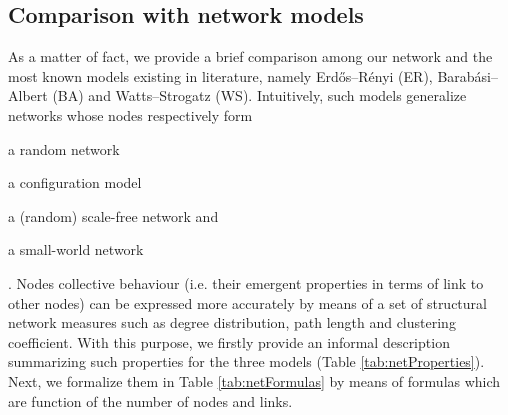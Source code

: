 \documentclass[sigchi]{acmart}
\begin{document}
\subsection{Comparison with network models}
As a matter of fact, we provide a brief comparison among our network and the most known models existing in literature, namely Erdős–Rényi (ER)\cite{Erdos1959}, Barabási–Albert (BA)\cite{Barabasi509} and Watts–Strogatz (WS)\cite{Watts-Colective-1998}. Intuitively, such models generalize networks whose nodes respectively form \begin{enumerate*}[label=(\roman*)]
    \item a random network
    \item a configuration model
    \item a (random) scale-free network and 
    \item a small-world network
\end{enumerate*}. Nodes collective behaviour (i.e. their emergent properties in terms of link to other nodes) can be expressed more accurately by means of a set of structural network measures such as degree distribution, path length and clustering coefficient. With this purpose, we firstly provide an informal description summarizing such properties for the three models (Table \ref{tab:netProperties}). Next, we formalize them in Table \ref{tab:netFormulas} by means of formulas which are function of the number of nodes and links.

\begin{table}
  \caption{Order of magnitude of topological measures for ER, BA and WS models}
  \label{tab:netProperties}
\end{table}
\end{document}
